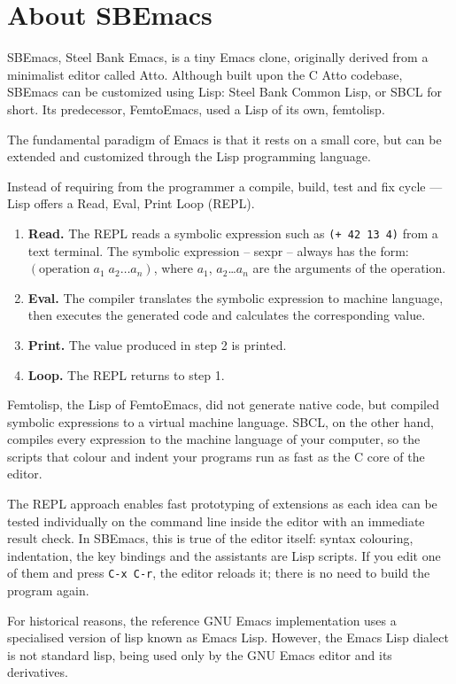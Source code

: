 \documentclass[a4paper,12pt,openany]{book}
\begin{document}
\chapter*{About SBEmacs}

SBEmacs, Steel Bank Emacs, is a tiny Emacs clone,
originally derived from a minimalist
editor called Atto. Although built
upon the C Atto codebase, SBEmacs can
be customized using Lisp: Steel Bank Common Lisp,
or SBCL for short. Its predecessor, FemtoEmacs,
used a Lisp of its own, femtolisp.

The fundamental paradigm of Emacs is that it
rests on a small core, but can be
extended and customized through
the Lisp programming language.

Instead of requiring from the programmer a compile,
build, test and fix cycle ---
Lisp offers a Read, Eval, Print Loop (REPL).
\begin{enumerate}
\item {\bf Read.} The REPL reads
a symbolic expression
such as \verb|(+ 42 13 4)| from
a text terminal. The symbolic expression -- sexpr --
always has the form: $(\textrm{operation}\;a_1\;a_2\ldots a_n)$,
where $a_1$, $a_2$\ldots $a_n$ are the arguments of
the operation.
\item {\bf Eval.} The compiler translates the symbolic
expression to machine language, then executes the
generated code and calculates the corresponding
value.
\item {\bf Print.} The value produced in step 2 is printed.
\item {\bf Loop.} The REPL returns to step 1.
\end{enumerate}

Femtolisp, the Lisp of FemtoEmacs, did not generate
native code, but compiled symbolic expressions
to a virtual machine language. SBCL, on the other hand,
compiles every expression to the machine language of
your computer, so the scripts that colour and indent
your programs run as fast as the C core of the editor.

The REPL approach enables fast prototyping
of extensions as each idea can be tested
individually on the command line inside
the editor with an immediate result check.
In SBEmacs, this is true of the editor itself:
syntax colouring, indentation, the key bindings and the
assistants are Lisp scripts. If you edit one of them
and press \verb|C-x C-r|, the editor reloads it;
there is no need to build the program again.

For historical reasons, the reference GNU
Emacs implementation uses a specialised version of
lisp known as Emacs Lisp.  However, the Emacs Lisp
dialect is not standard lisp, being used
only by the GNU Emacs editor and its
derivatives.
\end{document}
